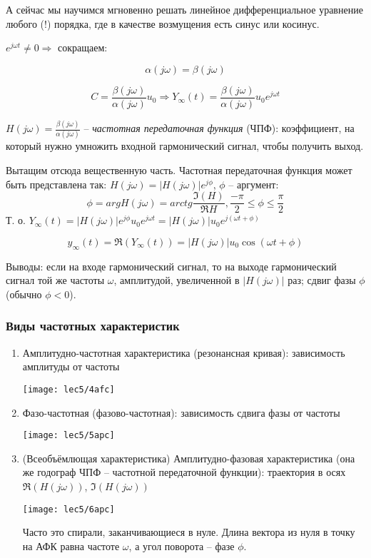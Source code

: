 \documentclass[main.tex]{subfiles}
\begin{document}
А сейчас мы научимся мгновенно решать линейное дифференциальное уравнение любого (!) порядка, где в качестве возмущения есть синус или косинус.

$ e^{j \omega t} \ne 0 \Rightarrow $ сокращаем:

$$ \alpha(j \omega) = \beta(j \omega) $$

$$ C = \frac{\beta(j\omega)}{\alpha(j\omega)} u_0 \Rightarrow Y_{\infty}(t) = \frac{\beta(j \omega)}{\alpha(j \omega)} u_0 e^{j \omega t} $$

$ H(j \omega) = \frac{\beta(j \omega)}{\alpha(j \omega)} $ -- \emph{частотная передаточная функция} (ЧПФ): коэффициент, на который нужно умножить входной гармонический сигнал, чтобы получить выход.

Вытащим отсюда вещественную часть.
Частотная передаточная функция может быть представлена так: $ H(j\omega) = |H(j\omega)| e^{j \phi} $, $\phi$ -- аргумент:
$$ \phi = arg H(j \omega) = arctg \frac{\Im(H)}{\Re H}, \frac{-\pi}{2} \le \phi \le \frac{\pi}{2} $$
Т. о. $ Y_\infty(t) = |H(j\omega)| e^{j \phi} u_0 e^{j \omega t} = |H(j\omega)|u_0 e^{j(\omega t + \phi)} $

$$ \boxed{ y_\infty(t) = \Re(Y_\infty(t)) = |H(j \omega)| u_0 \cos(\omega t + \phi) } $$

Выводы: если на входе гармонический сигнал, то на выходе гармонический сигнал той же частоты $ \omega $, амплитудой, увеличенной в $ |H(j \omega)| $ раз; сдвиг фазы $\phi$ (обычно $ \phi < 0 $).

\subsubsection{Виды частотных характеристик}

\begin{enumerate}[noitemsep]
    \item Амплитудно-частотная характеристика (резонансная кривая): зависимость амплитуды от частоты

    \texttt{[image: lec5/4afc]}

    \item Фазо-частотная (фазово-частотная): зависимость сдвига фазы от частоты

    \texttt{[image: lec5/5apc]}

    \item (Всеобъёмлющая характеристика) Амплитудно-фазовая характеристика (она же годограф ЧПФ -- частотной передаточной функции): траектория в осях $ \Re (H(j\omega)) $, $ \Im(H(j\omega)) $

    \texttt{[image: lec5/6apc]}

    Часто это спирали, заканчивающиеся в нуле.
    Длина вектора из нуля в точку на АФК равна частоте $ \omega $, а угол поворота -- фазе $ \phi $.
\end{enumerate}
\end{document}
